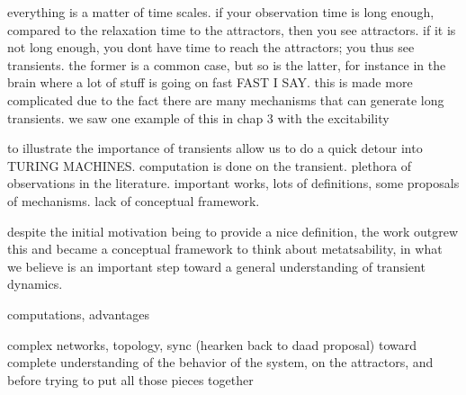 everything is a matter of time scales. if your observation time is long enough, compared to the relaxation time to the attractors, then you see attractors. if it is not long enough, you dont have time to reach the attractors; you thus see transients. the former is a common case, but so is the latter, for instance in the brain where a lot of stuff is going on fast FAST I SAY. this is made more complicated due to the fact there are many mechanisms that can generate long transients. we saw one example of this in chap 3 with the excitability 

to illustrate the importance of transients allow us to do a quick detour into TURING MACHINES. computation is done on the transient. 
plethora of observations in the literature. important works, lots of definitions, some proposals of mechanisms. lack of conceptual framework. 


despite the initial motivation being to provide a nice definition, the work outgrew this and became a conceptual framework to think about metatsability, in what we believe is an important step toward a general understanding of transient dynamics. 

computations, advantages

complex networks, topology, sync (hearken back to daad proposal)
toward complete understanding of the behavior of the system, on the attractors, and before 
trying to put all those pieces together

